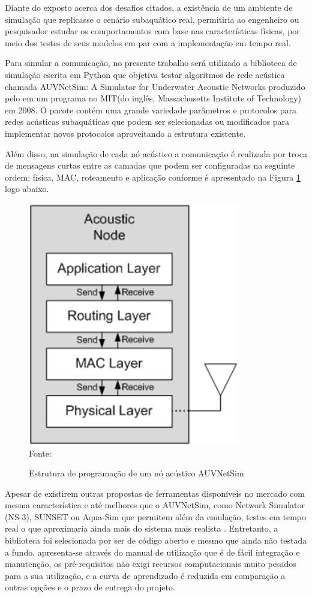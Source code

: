 Diante do exposto acerca dos desafios citados, a existência de um ambiente de simulação que replicasse o cenário subaquático real, permitiria ao engenheiro ou pesquisador estudar os comportamentos com base nas características físicas, por meio dos testes de seus modelos em par com a implementação em tempo real.

Para simular a comunicação, no presente trabalho será utilizado a biblioteca de simulação escrita em Python que objetiva testar algoritmos de rede acústica chamada AUVNetSim: A Simulator for Underwater Acoustic Networks produzido pelo \cite{montana2008auvnetsim} em um programa no MIT(do inglês, Massachusetts Institute of Technology) em 2008. O pacote contém uma grande variedade parâmetros e protocolos para redes acústicas subaquáticas que podem ser selecionadas ou modificados para implementar novos protocolos aproveitando a estrutura existente.

Além disso, na simulação de cada nó acústico a comunicação é realizada por troca de mensagens curtas entre as camadas que podem ser configuradas na seguinte ordem: física, MAC, roteamento e aplicação conforme é apresentado na Figura \ref{fig:auvnetsim} logo abaixo.

\begin{figure}
	\centering
	\caption{Estrutura de programação de um nó acústico AUVNetSim}
	\label{fig:auvnetsim}
	\includegraphics[width=0.3\linewidth]{images/auvnetsim}\\
	\footnotesize Fonte: \cite{montana2008auvnetsim}
\end{figure}

Apesar de existirem outras propostas de ferramentas disponíveis no mercado com mesma característica e até melhores que o AUVNetSim, como Network Simulator (NS-3), SUNSET ou Aqua-Sim que permitem além da emulação, testes em tempo real \cite{godi2021survey} o que aproximaria ainda mais do sistema mais realista . Entretanto, a biblioteca foi selecionada por ser de código aberto e mesmo que ainda não testada a fundo, apresenta-se através do manual de utilização \cite{montana2008auvnetsim} que é de fácil integração e manutenção, os pré-requisitos não exigi recursos computacionais muito pesados para a sua utilização, e a curva de aprendizado é reduzida em comparação a outras opções e o prazo de entrega do projeto.

